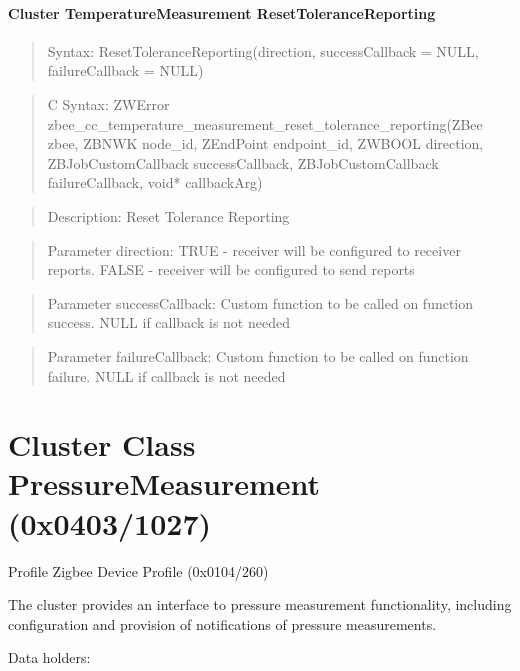 \paragraph{Cluster TemperatureMeasurement ResetToleranceReporting}
\begin{quote}Syntax: ResetToleranceReporting(direction, successCallback = NULL, failureCallback = NULL)\end{quote}
\begin{quote}C Syntax: ZWError zbee\_cc\_temperature\_measurement\_reset\_tolerance\_reporting(ZBee zbee, ZBNWK node\_id, ZEndPoint endpoint\_id, ZWBOOL direction, ZBJobCustomCallback successCallback, ZBJobCustomCallback failureCallback, void* callbackArg)\end{quote}
\begin{quote}Description: Reset Tolerance Reporting\end{quote}
\begin{quote}Parameter direction: TRUE  - receiver will be configured to receiver reports. FALSE - receiver will be configured to send reports\end{quote}
\begin{quote}Parameter successCallback: Custom function to be called on function success. NULL if callback is not needed\end{quote}
\begin{quote}Parameter failureCallback: Custom function to be called on function failure. NULL if callback is not needed\end{quote}



\section{Cluster Class PressureMeasurement (0x0403/1027)}

Profile Zigbee Device Profile (0x0104/260)

The cluster provides an interface to pressure measurement functionality, including configuration and provision of notifications of pressure measurements.
\newline

\noindent
Data holders:

